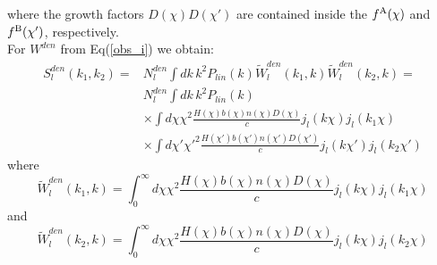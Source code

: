 where the growth factors $D(\chi) D(\chi')$ are contained inside the $f^{\rm A}(\chi)$ and $f^{\rm B}(\chi')$, respectively. \\
For $W^{den}$ from Eq(\ref{obs_i}) we obtain:
\begin{equation}
\begin{aligned}
S_l^{den}(k_1,k_2) = 
& N_l^{den} \int dk \, k^2 P_{lin}(k) \widetilde{W}_l^{den}(k_1,k) \widetilde{W}_l^{den}(k_2,k) = \\
& N_l^{den} \int dk \, k^2 P_{lin}(k) \\
& \times \int d\chi \chi^2 \frac{H(\chi)b(\chi)n(\chi)D(\chi)}{c} j_l(k\chi) j_l(k_1\chi) \\
& \times \int d\chi' \chi'^2 \frac{H(\chi')b(\chi')n(\chi')D(\chi')}{c} j_l(k\chi') j_l(k_2\chi')
\end{aligned}
\end{equation}
where 
\begin{equation}
    \widetilde{W}_l^{den}(k_1,k) = \int_0^{\infty} d\chi \chi^2 \frac{H(\chi)b(\chi)n(\chi)D(\chi)}{c} j_l(k\chi) j_l(k_1 \chi)
\end{equation}
and 
\begin{equation}
    \widetilde{W}_l^{den}(k_2,k) = \int_0^{\infty} d\chi \chi^2 \frac{H(\chi)b(\chi)n(\chi)D(\chi)}{c} j_l(k\chi) j_l(k_2 \chi)
\end{equation}